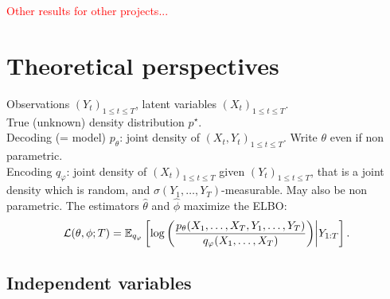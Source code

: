 \documentclass{article}
\newcommand{\1}{\mathbbm{1}}
\newcommand{\E}{\mathbb{E}}
\begin{document}
\clearpage
\newpage

\appendix

\textcolor{red}{Other results for other projects...}

\section{Theoretical perspectives}

Observations $(Y_{t})_{1\leq t \leq T}$, latent variables $(X_{t})_{1\leq t \leq T}$.\\
True (unknown) density distribution $p^{\star}$.\\
Decoding (= model) $p_{\theta}$: joint density of $(X_{t}, Y_{t})_{1\leq t \leq T}$. Write $\theta$ even if non parametric.\\
Encoding $q_{\varphi}$: joint density of $(X_{t})_{1\leq t \leq T}$ given $(Y_{t})_{1\leq t \leq T}$, that is a joint density which is random, and $\sigma(Y_{1},\ldots,Y_{T})$-measurable. May also be non parametric.  The estimators $\widehat{\theta}$ and $\widehat{\phi}$ maximize the ELBO:
$$
{\cal L}(\theta,\phi; T)= \E_{q_{\varphi}} \left[ \log \left( \frac{p_{\theta}(X_{1},\ldots,X_{T},Y_{1},\ldots,Y_{T})}{q_{\varphi}(X_{1},\ldots,X_{T})}\right)\middle\vert Y_{1:T}\right].
$$

\subsection{Independent variables}
\end{document}
